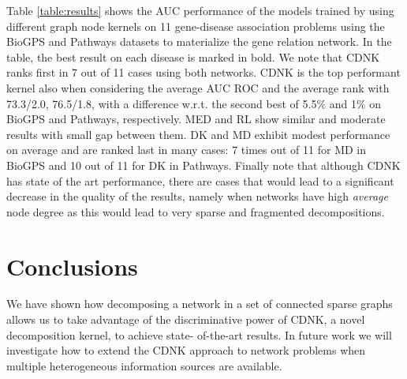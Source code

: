 \documentclass{esannV2}
\begin{document}
Table \ref{table:results} shows the AUC performance of the models trained by
using different graph node kernels on 11 gene-disease association problems
using the BioGPS and Pathways datasets to materialize the gene relation
network. In the table, the best result on each disease is marked in bold. We
note that CDNK ranks first in 7 out of 11 cases using  both networks. CDNK is
the top performant kernel also when considering the average AUC ROC and the
average rank with 73.3/2.0, 76.5/1.8, with a difference w.r.t. the second best
of 5.5$\%$ and 1$\%$ on BioGPS and Pathways, respectively. MED and RL show
similar and moderate results with small gap between them. DK and MD exhibit
modest performance on average and  are ranked last in many cases: 7
times out of 11 for MD in BioGPS and 10 out of 11 for DK in Pathways. 
Finally note that although CDNK has state of the art performance, there are
cases that would lead to a significant decrease in the quality of the results,
namely when networks have high {\em average} node degree as this would lead to
very sparse and fragmented decompositions.

\section{Conclusions} \label{conclusions} We have shown how decomposing a
network in a set of connected sparse graphs allows us to take advantage of the
discriminative power of CDNK, a novel decomposition kernel, to achieve state-
of-the-art results. In future work we will investigate how to extend the CDNK
approach to network problems when  multiple heterogeneous information sources
are available. 
\end{document}
